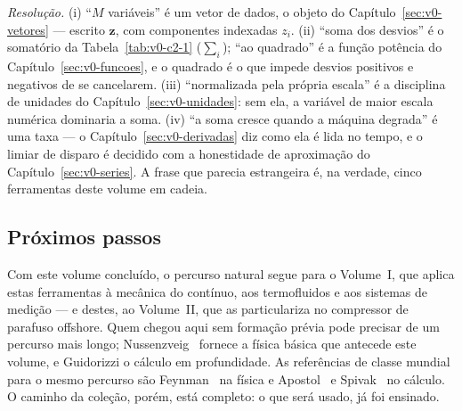 \documentclass[12pt,a4paper]{article}
\numberwithin{equation}{section}
\numberwithin{table}{section}
\numberwithin{figure}{section}
\begin{document}
\emph{Resolução.} (i) ``$M$ variáveis'' é um vetor de dados, o objeto do
Capítulo~\ref{sec:v0-vetores} --- escrito $\bm{z}$, com componentes
indexadas $z_i$. (ii) ``soma dos desvios'' é o somatório da
Tabela~\ref{tab:v0-c2-1} ($\sum_i$); ``ao quadrado'' é a função potência
do Capítulo~\ref{sec:v0-funcoes}, e o quadrado é o que impede desvios
positivos e negativos de se cancelarem. (iii) ``normalizada pela própria
escala'' é a disciplina de unidades do Capítulo~\ref{sec:v0-unidades}:
sem ela, a variável de maior escala numérica dominaria a soma. (iv) ``a
soma cresce quando a máquina degrada'' é uma taxa --- o Capítulo~\ref{sec:v0-derivadas}
diz como ela é lida no tempo, e o limiar de disparo é decidido com a
honestidade de aproximação do Capítulo~\ref{sec:v0-series}. A frase que
parecia estrangeira é, na verdade, cinco ferramentas deste volume em
cadeia.

\subsection{Próximos passos}

Com este volume concluído, o percurso natural segue para o Volume~I, que
aplica estas ferramentas à mecânica do contínuo, aos termofluidos e aos
sistemas de medição --- e destes, ao Volume~II, que as particulariza no
compressor de parafuso offshore. Quem chegou aqui sem formação prévia
pode precisar de um percurso mais longo; Nussenzveig~\cite{nussenzveig}
fornece a física básica que antecede este volume, e Guidorizzi
\cite{guidorizzi2013} o cálculo em profundidade. As referências de classe
mundial para o mesmo percurso são Feynman~\cite{feynman1963} na física e
Apostol~\cite{apostol1967} e Spivak~\cite{spivak2008} no cálculo. O
caminho da coleção, porém, está completo: o que será usado, já foi
ensinado.



\clearpage
{}
{}
\listoffigures

\clearpage
{}
{}
\listoftables
\end{document}
